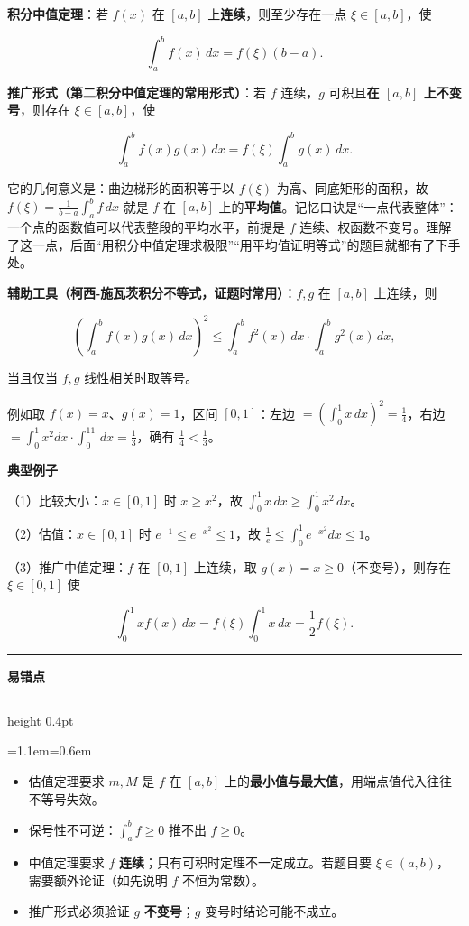 \documentclass[11pt,openany,UTF8]{ctexbook}
\newcommand{\callouthead}[2]{%
  \par\addvspace{7pt}\noindent
  {\color{#1}\rule[-0.15em]{3pt}{1.05em}}\hspace{0.5em}%
  {\bfseries\color{#1}#2}\par\nobreak\vspace{-0.35em}%
  {\color{rulesep}\hrule height 0.4pt}\nobreak\vspace{0.45em}%
  \begingroup\small\setlength{\parindent}{0pt}%
  \leftskip=1.1em\rightskip=0.6em\noindent\ignorespaces}
\newcommand{\calloutend}{\par\endgroup\addvspace{7pt}}
\newenvironment{callwarn}[1]{\callouthead{warnbar}{#1}}{\calloutend}
\begin{document}
\textbf{积分中值定理}：若 $f(x)$ 在 $[a,b]$ 上\textbf{连续}，则至少存在一点 $\xi\in[a,b]$，使

\[\int_a^bf(x)\,dx=f(\xi)(b-a).\]

\textbf{推广形式（第二积分中值定理的常用形式）}：若 $f$ 连续，$g$ 可积且\textbf{在 $[a,b]$ 上不变号}，则存在 $\xi\in[a,b]$，使

\[\int_a^bf(x)g(x)\,dx=f(\xi)\int_a^bg(x)\,dx.\]

它的几何意义是：曲边梯形的面积等于以 $f(\xi)$ 为高、同底矩形的面积，故 $f(\xi)=\frac{1}{b-a}\int_a^bf\,dx$ 就是 $f$ 在 $[a,b]$ 上的\textbf{平均值}。记忆口诀是“一点代表整体”：一个点的函数值可以代表整段的平均水平，前提是 $f$ 连续、权函数不变号。理解了这一点，后面“用积分中值定理求极限”“用平均值证明等式”的题目就都有了下手处。

\textbf{辅助工具（柯西-施瓦茨积分不等式，证题时常用）}：$f,g$ 在 $[a,b]$ 上连续，则

\[\left(\int_a^bf(x)g(x)\,dx\right)^2\leq\int_a^bf^2(x)\,dx\cdot\int_a^bg^2(x)\,dx,\]

当且仅当 $f,g$ 线性相关时取等号。

例如取 $f(x)=x$、$g(x)=1$，区间 $[0,1]$：左边 $=\left(\int_0^1x\,dx\right)^2=\frac{1}{4}$，右边 $=\int_0^1x^2dx\cdot\int_0^11\,dx=\frac{1}{3}$，确有 $\frac{1}{4}<\frac{1}{3}$。

\textbf{典型例子}

（1）比较大小：$x\in[0,1]$ 时 $x\geq x^2$，故 $\int_0^1x\,dx\geq\int_0^1x^2\,dx$。

（2）估值：$x\in[0,1]$ 时 $e^{-1}\leq e^{-x^2}\leq 1$，故 $\frac{1}{e}\leq\int_0^1e^{-x^2}dx\leq 1$。

（3）推广中值定理：$f$ 在 $[0,1]$ 上连续，取 $g(x)=x\geq0$（不变号），则存在 $\xi\in[0,1]$ 使

\[\int_0^1xf(x)\,dx=f(\xi)\int_0^1x\,dx=\frac{1}{2}f(\xi).\]

\begin{callwarn}{易错点}
\begin{itemize}
\item 估值定理要求 $m,M$ 是 $f$ 在 $[a,b]$ 上的\textbf{最小值与最大值}，用端点值代入往往不等号失效。
\item 保号性不可逆：$\int_a^bf\geq0$ 推不出 $f\geq0$。
\item 中值定理要求 $f$ \textbf{连续}；只有可积时定理不一定成立。若题目要 $\xi\in(a,b)$，需要额外论证（如先说明 $f$ 不恒为常数）。
\item 推广形式必须验证 $g$ \textbf{不变号}；$g$ 变号时结论可能不成立。
\end{itemize}
\end{callwarn}
\end{document}
